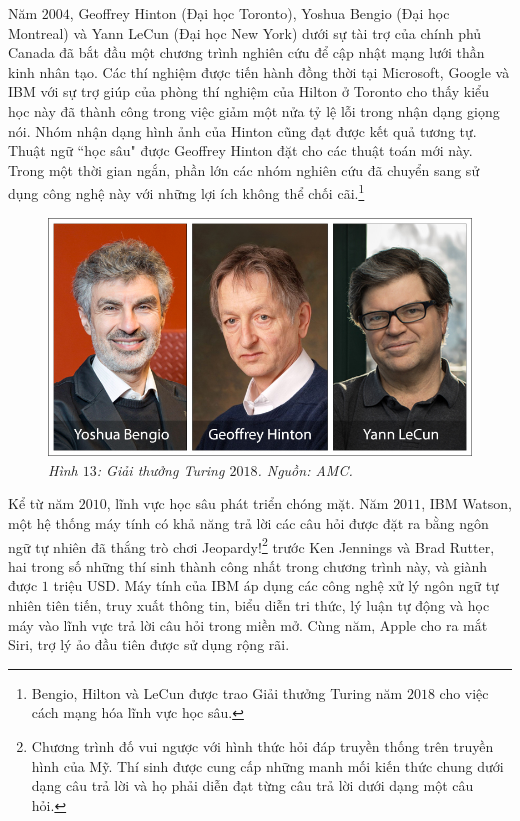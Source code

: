 \begin{multicols}{2}
\begin{figure}[H]
		\vspace*{-10pt}
	\end{figure}
	Năm $2004$, Geoffrey Hinton (Đại học Toronto), Yoshua Bengio (Đại học Montreal) và Yann LeCun (Đại học New York) dưới sự tài trợ của chính phủ Canada đã bắt đầu một chương trình nghiên cứu để cập nhật mạng lưới thần kinh nhân tạo. Các thí nghiệm được tiến hành đồng thời tại Microsoft, Google và IBM với sự trợ giúp của phòng thí nghiệm của Hilton ở Toronto cho thấy kiểu học này đã thành công trong việc giảm một nửa tỷ lệ lỗi trong nhận dạng giọng nói. Nhóm nhận dạng hình ảnh của Hinton cũng đạt được kết quả tương tự. Thuật ngữ ``học sâu" được Geoffrey Hinton đặt cho các thuật toán mới này. Trong một thời gian ngắn, phần lớn các nhóm nghiên cứu đã chuyển sang sử dụng công nghệ này với những lợi ích không thể chối cãi.\footnote{\color{cackithi}Bengio, Hilton và LeCun được trao Giải thưởng Turing năm $2018$ cho việc cách mạng hóa lĩnh vực học sâu.} 
	\begin{figure}[H]
		\vspace*{5pt}
		\centering
		\captionsetup{labelformat= empty, justification=centering}
		\includegraphics[width= 1\linewidth]{turing-2018-bengio-hinton-lecun.jpg}
		\caption{\small\textit{\color{cackithi}Hình $13$: Giải thưởng Turing $2018$. Nguồn: AMC.}}
		\vspace*{-15pt}
	\end{figure}
	Kể từ năm $2010$, lĩnh vực học sâu phát triển chóng mặt. 
	\vskip 0.1cm
	Năm $2011$, IBM Watson, một hệ thống máy tính có khả năng trả lời các câu hỏi được đặt ra bằng ngôn ngữ tự nhiên đã thắng trò chơi Jeopardy!\footnote{\color{cackithi}Chương trình đố vui ngược với hình thức hỏi đáp truyền thống trên truyền hình của Mỹ. Thí sinh được cung cấp những manh mối kiến thức chung dưới dạng câu trả lời và họ phải diễn đạt từng câu trả lời dưới dạng một câu hỏi.} trước Ken Jennings và Brad Rutter, hai trong số những thí sinh thành công nhất trong chương trình này, và giành được $1$ triệu USD. Máy tính của IBM áp dụng các công nghệ xử lý ngôn ngữ tự nhiên tiên tiến, truy xuất thông tin, biểu diễn tri thức, lý luận tự động và học máy vào lĩnh vực trả lời câu hỏi trong miền mở. Cùng năm, Apple cho ra mắt Siri, trợ lý ảo đầu tiên được sử dụng rộng rãi.

\end{multicols}
